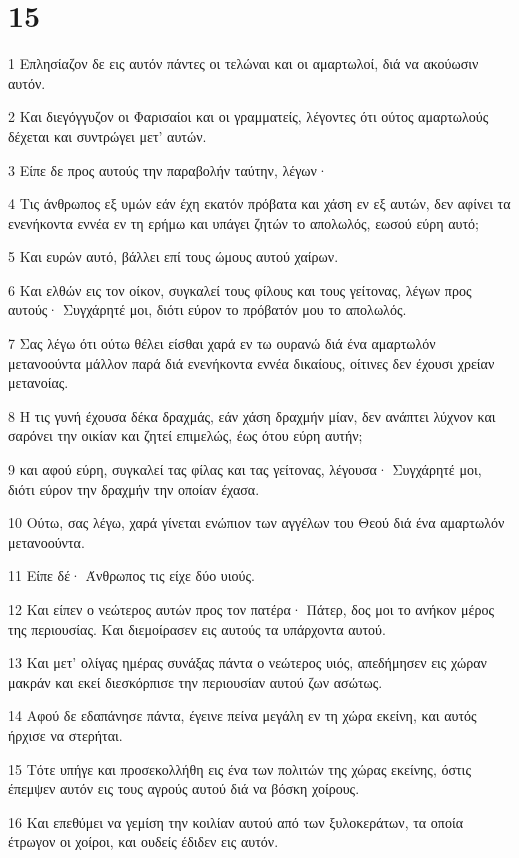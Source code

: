 \chapter{15}

\par 1 Επλησίαζον δε εις αυτόν πάντες οι τελώναι και οι αμαρτωλοί, διά να ακούωσιν αυτόν.
\par 2 Και διεγόγγυζον οι Φαρισαίοι και οι γραμματείς, λέγοντες ότι ούτος αμαρτωλούς δέχεται και συντρώγει μετ' αυτών.
\par 3 Είπε δε προς αυτούς την παραβολήν ταύτην, λέγων·
\par 4 Τις άνθρωπος εξ υμών εάν έχη εκατόν πρόβατα και χάση εν εξ αυτών, δεν αφίνει τα ενενήκοντα εννέα εν τη ερήμω και υπάγει ζητών το απολωλός, εωσού εύρη αυτό;
\par 5 Και ευρών αυτό, βάλλει επί τους ώμους αυτού χαίρων.
\par 6 Και ελθών εις τον οίκον, συγκαλεί τους φίλους και τους γείτονας, λέγων προς αυτούς· Συγχάρητέ μοι, διότι εύρον το πρόβατόν μου το απολωλός.
\par 7 Σας λέγω ότι ούτω θέλει είσθαι χαρά εν τω ουρανώ διά ένα αμαρτωλόν μετανοούντα μάλλον παρά διά ενενήκοντα εννέα δικαίους, οίτινες δεν έχουσι χρείαν μετανοίας.
\par 8 Η τις γυνή έχουσα δέκα δραχμάς, εάν χάση δραχμήν μίαν, δεν ανάπτει λύχνον και σαρόνει την οικίαν και ζητεί επιμελώς, έως ότου εύρη αυτήν;
\par 9 και αφού εύρη, συγκαλεί τας φίλας και τας γείτονας, λέγουσα· Συγχάρητέ μοι, διότι εύρον την δραχμήν την οποίαν έχασα.
\par 10 Ούτω, σας λέγω, χαρά γίνεται ενώπιον των αγγέλων του Θεού διά ένα αμαρτωλόν μετανοούντα.
\par 11 Είπε δέ· Άνθρωπος τις είχε δύο υιούς.
\par 12 Και είπεν ο νεώτερος αυτών προς τον πατέρα· Πάτερ, δος μοι το ανήκον μέρος της περιουσίας. Και διεμοίρασεν εις αυτούς τα υπάρχοντα αυτού.
\par 13 Και μετ' ολίγας ημέρας συνάξας πάντα ο νεώτερος υιός, απεδήμησεν εις χώραν μακράν και εκεί διεσκόρπισε την περιουσίαν αυτού ζων ασώτως.
\par 14 Αφού δε εδαπάνησε πάντα, έγεινε πείνα μεγάλη εν τη χώρα εκείνη, και αυτός ήρχισε να στερήται.
\par 15 Τότε υπήγε και προσεκολλήθη εις ένα των πολιτών της χώρας εκείνης, όστις έπεμψεν αυτόν εις τους αγρούς αυτού διά να βόσκη χοίρους.
\par 16 Και επεθύμει να γεμίση την κοιλίαν αυτού από των ξυλοκεράτων, τα οποία έτρωγον οι χοίροι, και ουδείς έδιδεν εις αυτόν.

